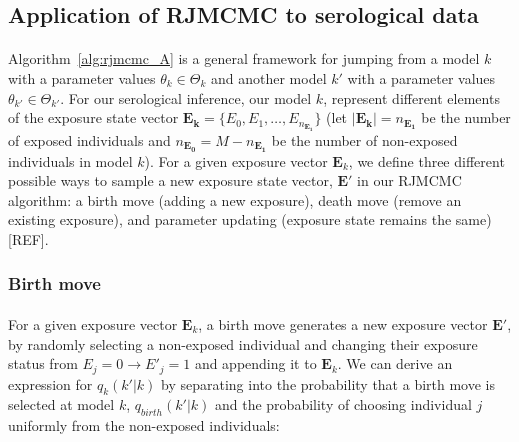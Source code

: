 




\subsection{Application of RJMCMC to serological data}
\paragraph{}Algorithm~\ref{alg:rjmcmc_A} is a general framework for jumping from a model $k$ with a parameter values $\theta_k \in \Theta_k$ and another model $k'$ with a parameter values $\theta_{k'} \in \Theta_{k'}$. For our serological inference, our model $k$, represent different elements of the exposure state vector $\mathbf{E_k} = \{E_0, E_1, \dots, E_{n_\mathbf{E_1}}\}$ (let $|\mathbf{E_k}| = n_\mathbf{E_1}$ be the number of exposed individuals and $n_\mathbf{E_0} = M - n_\mathbf{E_1}$ be the number of non-exposed individuals in model $k$). For a given exposure vector $\mathbf{E}_k$, we define three different possible ways to sample a new exposure state vector, $\mathbf{E'}$ in our RJMCMC algorithm: a birth move (adding a new exposure), death move (remove an existing exposure), and parameter updating (exposure state remains the same)[REF]. 

\subsubsection{Birth move}

\paragraph{}For a given exposure vector $\mathbf{E}_k$, a birth move generates a new exposure vector $\mathbf{E'}$, by randomly selecting a non-exposed individual and changing their exposure status from $E_j = 0 \rightarrow E'_j = 1$ and appending it to $\mathbf{E}_k$. We can derive an expression for $q_k(k' | k)$ by separating into the probability that a birth move is selected at model $k$, $q_{birth}(k' |k)$ and the probability of choosing individual $j$ uniformly from the non-exposed individuals:

